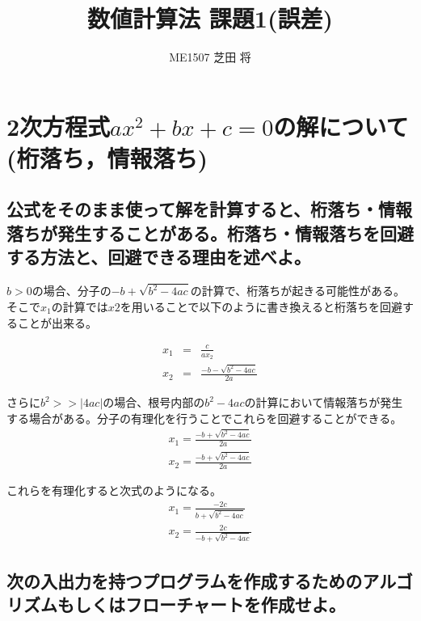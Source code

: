 \documentclass[]{jsarticle}
\title{\LARGE {数値計算法 課題1(誤差)}}
\author{\large {ME1507 芝田 将}}
\begin{document}
\maketitle

\section{2次方程式$ax^{2}+bx+c=0$の解について(桁落ち，情報落ち)}

\subsection{公式をそのまま使って解を計算すると、桁落ち・情報落ちが発生することがある。桁落ち・情報落ちを回避する方法と、回避できる理由を述べよ。}

$b>0$の場合、分子の$-b + \sqrt{b^{2}-4ac}$の計算で、桁落ちが起きる可能性がある。
そこで$x_{1}$の計算では$x2$を用いることで以下のように書き換えると桁落ちを回避することが出来る。

\begin{eqnarray}
x_{1} &=& \frac{c}{ax_{2}} \\
x_{2} &=& \frac{-b - \sqrt{b^{2}-4ac}}{2a}
\end{eqnarray}



さらに$b^{2} >> |4ac|$の場合、根号内部の$b^{2}-4ac$の計算において情報落ちが発生する場合がある。分子の有理化を行うことでこれらを回避することができる。
\begin{eqnarray}
x_{1} = \frac{-b + \sqrt{b^{2}-4ac}}{2a} \\
x_{2} = \frac{-b + \sqrt{b^{2}-4ac}}{2a}
\end{eqnarray}

これらを有理化すると次式のようになる。
\begin{eqnarray}
x_{1} = \frac{-2c}{b+\sqrt{b^{2}-4ac}} \\
x_{2} = \frac{2c}{-b+\sqrt{b^{2}-4ac}}
\end{eqnarray}


\subsection{次の入出力を持つプログラムを作成するためのアルゴリズムもしくはフローチャートを作成せよ。}
\end{document}
